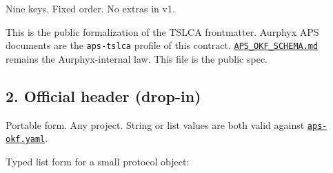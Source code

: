 Nine keys. Fixed order. No extras in v1.

This is the public formalization of the TSLCA frontmatter. Aurphyx APS documents are the \texttt{aps-tslca} profile of this contract. \href{./APS_OKF_SCHEMA.md}{\texttt{APS\_OKF\_SCHEMA.md}} remains the Aurphyx-internal law. This file is the public spec.

\subsection{2. Official header (drop-in)}\label{official-header-drop-in}

Portable form. Any project. String or list values are both valid against \href{./aps-okf.yaml}{\texttt{aps-okf.yaml}}.

\begin{Shaded}
\begin{Highlighting}[]
\PreprocessorTok{{-}{-}{-}}
\KeywordTok{:}\AttributeTok{ }
\KeywordTok{:}\AttributeTok{ }
\KeywordTok{:}\AttributeTok{ }
\KeywordTok{:}\AttributeTok{ }
\KeywordTok{:}\AttributeTok{ }
\KeywordTok{:}\AttributeTok{ }
\KeywordTok{:}\AttributeTok{ }
\KeywordTok{:}\AttributeTok{ }
\KeywordTok{:}\AttributeTok{ }
\PreprocessorTok{{-}{-}{-}}
\end{Highlighting}
\end{Shaded}

Typed list form for a small protocol object:

